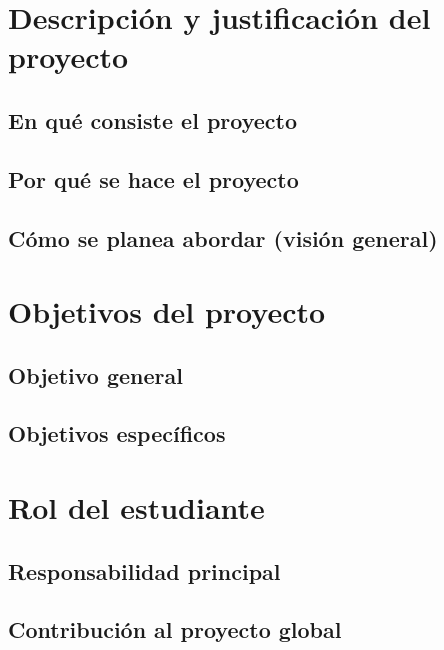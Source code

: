 \section{Descripción y justificación del proyecto}
\subsection{En qué consiste el proyecto}
\subsection{Por qué se hace el proyecto}
\subsection{Cómo se planea abordar (visión general)}

\section{Objetivos del proyecto}
\subsection{Objetivo general}
\subsection{Objetivos específicos}

\section{Rol del estudiante}
\subsection{Responsabilidad principal}
\subsection{Contribución al proyecto global}

